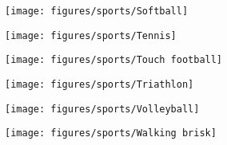 \documentclass[11pt]{article}
\begin{document}
    \clearpage

    \begin{figure}[htb!]
        \centering

        \begin{subfigure}{.5\textwidth}
            \centering
            \texttt{[image: figures/sports/Softball]}
        \end{subfigure}%
        \hfill
        \begin{subfigure}{.5\textwidth}
            \centering
            \texttt{[image: figures/sports/Tennis]}
        \end{subfigure}%
        \hfill
        \begin{subfigure}{.5\textwidth}
            \centering
            \texttt{[image: figures/sports/Touch football]}
        \end{subfigure}%
        \hfill
        \begin{subfigure}{.5\textwidth}
            \centering
            \texttt{[image: figures/sports/Triathlon]}
        \end{subfigure}%
        \hfill
        \begin{subfigure}{.5\textwidth}
            \centering
            \texttt{[image: figures/sports/Volleyball]}
        \end{subfigure}%
        \hfill
        \begin{subfigure}{.5\textwidth}
            \centering
            \texttt{[image: figures/sports/Walking brisk]}
        \end{subfigure}
    \end{figure}

    \clearpage
\end{document}
